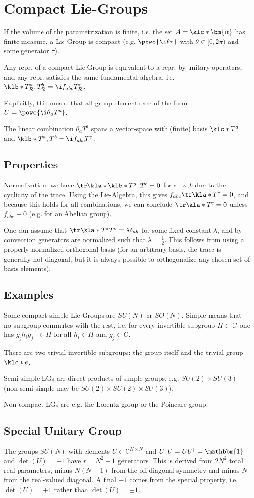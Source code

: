\documentclass[english, parskip=full]{scrbook}
\newcommand{\definition}[2]{\begin{tcolorbox}[colback=colorbackgrounddefinition,colframe=colordefinition, breakable,enhanced,title=\textbf{#1}.]#2\end{tcolorbox}}
\newcommand{\note}[1]{\begin{tcolorbox}[colback=colorbackgroundnote,colframe=colornote, breakable,enhanced]#1\end{tcolorbox}}
\begin{document}
\section{Compact Lie-Groups}
If the volume of the parametrization is finite, i.e. the set $A=\klc*{\bm{\alpha}}$ has finite measure, a Lie-Group is compact (e.g. $\powe{\i\theta \tau}$ with $\theta\in [0,2\pi)$ and some generator $\tau$).
\definition{Representation Theorem}{
Any repr. of a compact Lie-Group is equivalent to a repr. by unitary operators, and any repr. satisfies the same fundamental algebra, i.e. $\klb*{T^a_\mathcal{R}, T^b_\mathcal{R}} = \i f_{abc} T^c_\mathcal{R}$.

Explicitly, this means that all group elements are of the form $U=\powe{\i \theta_a T^a}$.
}
The linear combination $\theta_a T^a$ spans a vector-space with (finite) basis $\klc*{T^a}$ and $\klb*{T^a,T^b} = \i f_{abc} T^c$.
\subsection{Properties}
Normalization: we have $\tr\kla*{\klb*{T^a,T^b}}=0$ for all $a,b$ due to the cyclicity of the trace.
Using the Lie-Algebra, this gives $f_{abc} \tr\kla*{T^c}=0$, and because this holds for all combinations, we can conclude $\tr\kla*{T^c}=0$ unless $f_{abc}\equiv 0$ (e.g. for an Abelian group).
\note{One can assume that $\tr\kla*{T^aT^b}=\lambda \delta_{ab}$ for some fixed constant $\lambda$, and by convention generators are normalized such that $\lambda=\frac{1}{2}$.
This follows from using a properly normalized orthogonal basis (for an arbitrary basis, the trace is generally not diagonal; but it is always possible to orthogonalize any chosen set of basis elements).
}
\subsection{Examples}
Some compact simple Lie-Groups are $SU(N)$ or $SO(N)$.
Simple means that no subgroup commutes with the rest, i.e. for every invertible subgroup $H\subset G$ one has $g_jh_ig_j^{-1}\in H$ for all $h_i\in H$ and $g_j\in G$.
\note{There are two trivial invertible subgroups: the group itself and the trivial group $\klc*{e}$.}
Semi-simple LGs are direct products of simple groups, e.g. $SU(2)\times SU(3)$ (non semi-simple may be $SU(2)\times SU(2) \times SU(3)$).

Non-compact LGs are e.g. the Lorentz group or the Poincare group.
\subsection{Special Unitary Group}
The groups $SU(N)$ with elements $U\in\mathbb{C}^{N\times N}$ and $U^\dagger U=UU^\dagger = \mathbbm{1}$ and $\det(U)=+1$ have $r=N^2-1$ generators.
This is derived from $2N^2$ total real parameters, minus $N(N-1)$ from the off-diagonal symmetry and minus $N$ from the real-valued diagonal.
A final $-1$ comes from the special property, i.e. $\det(U)=+1$ rather than $\det(U)=\pm 1$.
\end{document}
